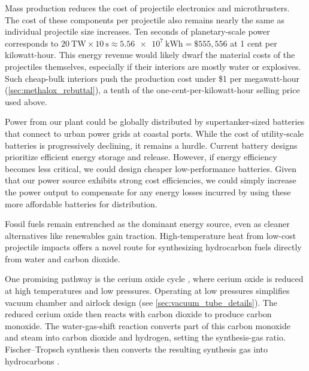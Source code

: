 \documentclass{article}
\begin{document}
Mass production reduces the cost of projectile electronics and microthrusters. The cost of these components per projectile also remains nearly the same as individual projectile size increases.  Ten seconds of planetary-scale power corresponds to $\SI{20}{\tera\watt} \times \SI{10}{\second} \approx \SI{5.56e7}{\kilo\watt\hour} = \$555,556$ at 1 cent per kilowatt-hour.  This energy revenue would likely dwarf the material costs of the projectiles themselves, especially if their interiors are mostly water or explosives. Such cheap-bulk interiors push the production cost under \$1 per megawatt-hour (\autoref{sec:methalox_rebuttal}), a tenth of the one-cent-per-kilowatt-hour selling price used above.      

Power from our plant could be globally distributed by supertanker-sized batteries that connect to urban power grids at coastal ports.  While the cost of utility-scale batteries is progressively declining, it remains a hurdle. Current battery designs prioritize efficient energy storage and release. However, if energy efficiency becomes less critical, we could design cheaper low-performance batteries. Given that our power source exhibits strong cost efficiencies, we could simply increase the power output to compensate for any energy losses incurred by using these more affordable batteries for distribution. 

Fossil fuels remain entrenched as the dominant energy source, even as cleaner alternatives like renewables gain traction. High-temperature heat from low-cost projectile impacts offers a novel route for synthesizing hydrocarbon fuels directly from water and carbon dioxide.

One promising pathway is the cerium oxide cycle \cite{CeriaThermoCycles}, where cerium oxide is reduced at high temperatures and low pressures. Operating at low pressures simplifies vacuum chamber and airlock design (see \autoref{sec:vacuum_tube_details}). The reduced cerium oxide then reacts with carbon dioxide to produce carbon monoxide. The water-gas-shift reaction converts part of this carbon monoxide and steam into carbon dioxide and hydrogen, setting the synthesis-gas ratio. Fischer--Tropsch synthesis then converts the resulting synthesis gas into hydrocarbons \cite{water_gas_shift,fischer_tropsch}.
\end{document}
